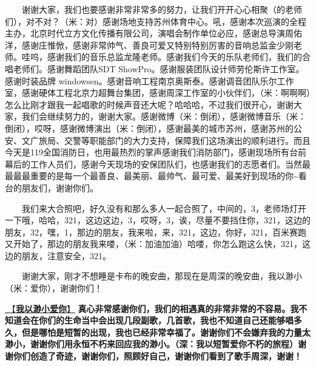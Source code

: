 \documentclass[]{ctexbook}
\begin{document}
  谢谢大家，我们也要感谢非常非常多的努力，让我们开开心心相聚（的老师们），对不对？（米：对）感谢场地支持苏州体育中心。吼，感谢本次巡演的全程主办，北京时代立方文化传播有限公司，演唱会制作单位必应，感谢总导演周佑洋，感谢庄惟惞，感谢非常帅气、善良可爱又特别特别厉害的音响总监金少刚老师。哇呜，感谢我们的音乐总监龙隆老师。感谢我们今天的乐队老师们，我们的合唱老师们。感谢舞蹈团队SDT ShowPro。感谢服装团队设计师劳伦斯许工作室。感谢时装品牌 windowsen。感谢音响工程南京奥斯泰。感谢调音团队乐尔工作室，感谢硬体工程北京力超舞台集团，感谢周深工作室的小伙伴们，（米：啊啊啊）怎么比刚才跟我一起唱歌的时候声音还大呢？哈哈哈，不过我们很开心，谢谢大家，我们会继续努力的，谢谢大家。感谢微博（米：倒闭），感谢微博音乐（米：倒闭），哎呀，感谢微博演出（米：倒闭），感谢最美的城市苏州，感谢苏州的公安、文广旅局、交警等职能部门的大力支持，保障我们这场演出的顺利进行。而且今天是119全国消防日，也用最热烈的掌声感谢我们消防部门，感谢现场所有台前幕后的工作人员们，感谢今天现场的安保团队们，也感谢我们的志愿者们。当然最最最最重要的是每一个最善良、最美丽、最帅气、最可爱、最美好到现场的你\textasciitilde 看台的朋友们，谢谢你们。

  我们来大合照吧，好久没有和那么多人一起合照了，中间的，3，老师场灯开一下哦，哈哈，321，这边这边，3，哎呀，3，诶，尽量不要挡住你，321，这边的朋友，32，嘿，1，那边的朋友，我来啦，来，321，这边，你好，321，百米赛跑又开始了，那边的朋友我来喽，（米：加油加油）哈喽，你怎么跑这么快，321，这边的朋友，注意安全，321。

  谢谢大家，刚才不想睡是卡布的晚安曲，那现在是周深的晚安曲，我以渺小（米：爱你），谢谢你们！

\hyperref[loving-you-in-my-humble-way]{🎵【\textbf{我以渺小爱你}】} \textbf{真心非常感谢你们，我们的相遇真的非常非常的不容易。我不知道会在你们的生命当中会出现几段副歌，几首歌，我也不知道自己还能够唱多久，但是哪怕是短暂的出现，我也已经非常幸福了。谢谢你们不会嫌弃我的力量太渺小，谢谢你们用永恒不朽来回应我的渺小。（深：我以短暂爱你不朽的旅程）谢谢你们创造了奇迹，谢谢你们，照顾好自己，谢谢你们看到了歌手周深，谢谢！}
\end{document}
